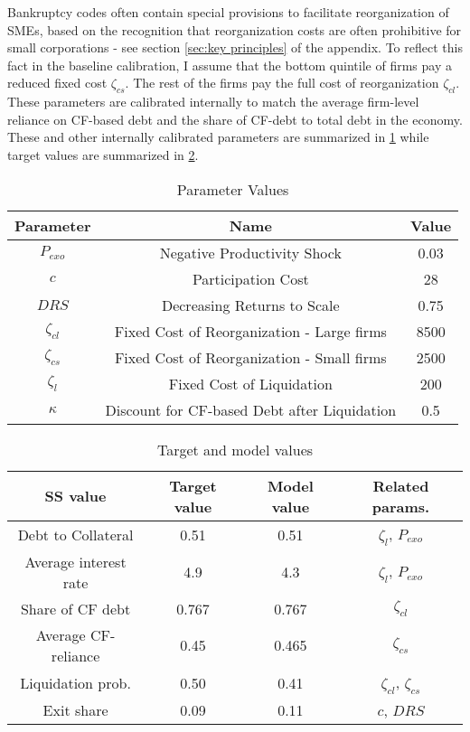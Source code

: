 \documentclass[12pt]{article}
\begin{document}
Bankruptcy codes often contain special provisions to facilitate reorganization of SMEs, based on the recognition that reorganization costs are often prohibitive for small corporations - see section \ref{sec:key principles} of the appendix. To reflect this fact in the baseline calibration, I assume that the bottom quintile of firms pay a reduced fixed cost $\zeta_{cs}$. The rest of the firms pay the full cost of reorganization $\zeta_{cl}$. These parameters are calibrated internally to match the average firm-level reliance on CF-based debt and the share of CF-debt to total debt in the economy. These and other internally calibrated parameters are summarized in \ref{tab:internal calib} while target values are summarized in \ref{tab:targets}.

\begin{table}[h!]
    \centering
    \begin{tabular}{c|c|c}
    \toprule
    \textbf{Parameter} & \textbf{Name} & \textbf{Value} \\
    \midrule
    $P_{exo}$ & Negative Productivity Shock & 0.03 \\
    $c$ & Participation Cost & 28 \\
   $ DRS$ & Decreasing Returns to Scale & 0.75 \\
    $\zeta_{cl}$ & Fixed Cost of Reorganization - Large firms & 8500 \\
    $\zeta_{cs}$ & Fixed Cost of Reorganization - Small firms & 2500 \\
    $\zeta_l$ & Fixed Cost of Liquidation & 200 \\
    $\kappa$ & Discount for CF-based Debt after Liquidation & 0.5 \\
    \bottomrule
    \end{tabular}
    \caption{Parameter Values}
    \label{tab:internal calib}
\end{table}

\begin{table}[h!]
    \centering
    \begin{tabular}{c|c|c|c}
    \toprule
    \textbf{SS value} & \textbf{Target value} & \textbf{Model value} & \textbf{Related params.} \\ 
    \midrule
    Debt to Collateral & 0.51 & 0.51 & $\zeta_l$, $P_{exo}$\\
    Average interest rate & 4.9 & 4.3 &  $\zeta_l$, $P_{exo}$  \\
    Share of CF debt & 0.767 & 0.767 &  $\zeta_{cl}$ \\
    Average CF-reliance & 0.45 & 0.465 &  $\zeta_{cs}$ \\
    Liquidation prob. & 0.50 & 0.41 & $\zeta_{cl}$, $\zeta_{cs}$ \\
    Exit share & 0.09 & 0.11 & $c$, $DRS$ \\
        \bottomrule
    \end{tabular}
    \caption{Target and model values}
    \label{tab:targets}
\end{table}
\end{document}
